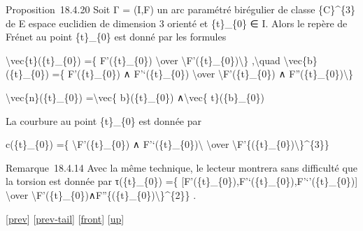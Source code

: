 \documentclass[]{article}
\begin{document}
Proposition~18.4.20 Soit Γ = (I,F) un arc paramétré birégulier de classe
\{C\}\^{}\{3\} de E espace euclidien de dimension 3 orienté et
\{t\}\_\{0\} ∈ I. Alors le repère de Frénet au point \{t\}\_\{0\} est
donné par les formules

\textbackslash{}vec\{t\}(\{t\}\_\{0\}) =\{ F'(\{t\}\_\{0\})
\textbackslash{}over
\textbackslash{}\textbar{}F'(\{t\}\_\{0\})\textbackslash{}\textbar{}\}
,\textbackslash{}quad \textbackslash{}vec\{b\}(\{t\}\_\{0\}) =\{
F'(\{t\}\_\{0\}) ∧ F'`(\{t\}\_\{0\}) \textbackslash{}over
\textbackslash{}\textbar{}F'(\{t\}\_\{0\}) ∧
F''(\{t\}\_\{0\})\textbackslash{}\textbar{}\}

\textbackslash{}vec\{n\}(\{t\}\_\{0\}) =\textbackslash{}vec\{
b\}(\{t\}\_\{0\}) ∧\textbackslash{}vec\{ t\}(\{b\}\_\{0\})

La courbure au point \{t\}\_\{0\} est donnée par

c(\{t\}\_\{0\}) =\{ \textbackslash{}\textbar{}F'(\{t\}\_\{0\}) ∧
F'`(\{t\}\_\{0\})\textbackslash{}\textbar{} \textbackslash{}over
\textbackslash{}\textbar{}F'\{(\{t\}\_\{0\})\textbackslash{}\textbar{}\}\^{}\{3\}\}

Remarque~18.4.14 Avec la même technique, le lecteur montrera sans
difficulté que la torsion est donnée par τ(\{t\}\_\{0\}) =\{
{[}F'(\{t\}\_\{0\}),F'`(\{t\}\_\{0\}),F'`'(\{t\}\_\{0\}){]}
\textbackslash{}over
\textbackslash{}\textbar{}F'(\{t\}\_\{0\})∧F''\{(\{t\}\_\{0\})\textbackslash{}\textbar{}\}\^{}\{2\}\}
.

{[}\href{coursse98.html}{prev}{]}
{[}\href{coursse98.html\#tailcoursse98.html}{prev-tail}{]}
{[}\href{coursse99.html}{front}{]}
{[}\href{coursch19.html\#coursse99.html}{up}{]}
\end{document}
